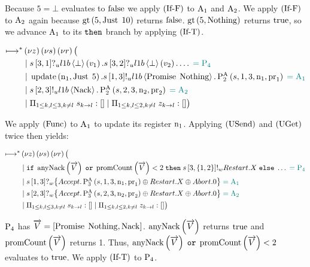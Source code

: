 Because $5 = \bot$ evaluates to $\False$ we apply $\RIfF$ to $\Acceptor{1}$ and $\Acceptor{2}$.
We apply $\RIfF$ to $\Acceptor{2}$ again because $\greaterThan{5}{\Just{10}}$ returns $\False$.
$\greaterThan{5}{\Nothing}$ returns $\True$, so we advance $\Acceptor{1}$ to its $\ThenName$ branch by applying $\RIfT$.

\begin{align*}
\mapstostar&\NuChannels\big (\\
&\Or
    \ReceiveUnreliableP{\ChannelS}{3}{1}{\LOneB}{\bot}{v_1}.
    \ReceiveUnreliableP{\ChannelS}{3}{2}{\LOneB}{\bot}{v_2}.
    \ldots
    \comment{= \Proposer{4}}\\
&\Or
    \update{\NumberRegister_1}{\Just{5}}.
    \SendUnreliableP{\ChannelS}{1}{3}{\LOneB}{\Promise{\Nothing}}.
    \PaTwo{\ChannelS, 1, 3, \NumberRegister_1, \ProposalRegister_1}
    \comment{= \Acceptor{1}}\\
&\Or
    \SendUnreliableP{\ChannelS}{2}{3}{\LOneB}{\Nack}.
    \PaTwo{\ChannelS, 2, 3, \NumberRegister_2, \ProposalRegister_2}
    \comment{= \Acceptor{2}}\\
&\Or \InnerSessionQueues{\ChannelS}
\Or \OuterSessionQueues
\big )
\end{align*}

We apply $\RSideEffect$ to $\Acceptor{1}$ to update its register $\NumberRegister_1$.
Applying $\RUsend$ and $\RUget$ twice then yields:

\begin{align*}
\mapstostar&\NuChannels\big (\\
&\Or
    \If \anyNack{\VectorV} \tOr \promiseCount{\VectorV} < 2
    \;\Then \SendWeaklyP{\ChannelS}{3}{\Curly{1, 2}}{\Restart}. \RecursionVariable
    \;\Else \ldots
    \comment{= \Proposer{4}}\\
&\Or
    \ReceiveWeaklyP{\ChannelS}{1}{3}{
        \Accept. \PaThree{\ChannelS, 1, 3, \NumberRegister_1, \ProposalRegister_1} \oplus \Restart. \RecursionVariable \oplus \Abort . \End
    }
    \comment{= \Acceptor{1}}\\
&\Or
    \ReceiveWeaklyP{\ChannelS}{2}{3}{
        \Accept. \PaThree{\ChannelS, 2, 3, \NumberRegister_2, \ProposalRegister_2} \oplus \Restart. \RecursionVariable \oplus \Abort . \End
    }
    \comment{= \Acceptor{2}}\\
&\Or \InnerSessionQueues{\ChannelS}
\Or \OuterSessionQueues
\big )
\end{align*}

$\Proposer{4}$ has $\VectorV = \Bracket{\Promise{\Nothing}, \Nack}$.
$\anyNack{\VectorV}$ returns $\True$ and $\promiseCount{\VectorV}$ returns 1.
Thus, $\anyNack{\VectorV} \tOr \promiseCount{\VectorV} < 2$ evaluates to $\True$.
We apply $\RIfT$ to $\Proposer{4}$.


